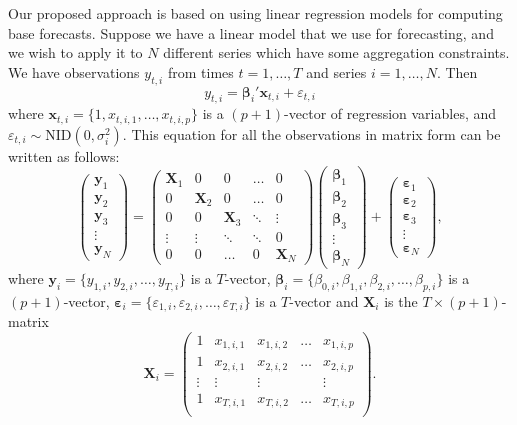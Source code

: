 \documentclass[11pt,a4paper,]{article}
\begin{document}
Our proposed approach is based on using linear regression models for computing base forecasts. Suppose we have a linear model that we use for forecasting, and we wish to apply it to \(N\) different series which have some aggregation constraints. We have observations \(y_{t,i}\) from times \(t=1,\dots,T\) and series \(i=1,\dots,N\). Then
\begin{equation}
y_{t,i} = \bm{\beta}_{i}' \bm{x}_{t,i} + \varepsilon_{t,i}
\end{equation}
where \(\bm{x}_{t,i}=\{1, x_{t,i,1},\dots,x_{t,i,p}\}\) is a \((p+1)\)-vector of regression variables, and \(\varepsilon_{t,i}\sim \text{NID}(0,\sigma_i^2)\). This equation for all the observations in matrix form can be written as follows:
\begin{equation}\label{eq:linearmodel}
\begin{pmatrix}
\bm{y}_1\\
\bm{y}_2\\
\bm{y}_3 \\
\vdots\\
\bm{y}_N
\end{pmatrix}=
\begin{pmatrix}
\bm{X}_1 & 0        & 0       & \dots  & 0\\
0        & \bm{X}_2 & 0        & \dots  & 0\\
0        & 0        & \bm{X}_3 & \ddots & \vdots \\
\vdots   & \vdots   & \ddots   & \ddots & 0\\
0        & 0    & \dots    & 0      & \bm{X}_N
\end{pmatrix}
\begin{pmatrix}
\bm{\beta}_1\\
\bm{\beta}_2\\
\bm{\beta}_3\\
\vdots\\
\bm{\beta}_N
\end{pmatrix}+
\begin{pmatrix}
\bm{\varepsilon}_1\\
\bm{\varepsilon}_2\\
\bm{\varepsilon}_3\\
\vdots \\
\bm{\varepsilon}_N
\end{pmatrix},
\end{equation}
where \(\bm{y}_i = \{y_{1,i}, y_{2,i}, \dots, y_{T,i}\}\) is a \(T\)-vector, \({\bm{\beta}}_i = \{\beta_{0,i}, \beta_{1,i}, \beta_{2,i}, \dots, \beta_{p,i}\}\) is a \((p+1)\)-vector, \({\bm{\varepsilon}}_i = \{\varepsilon_{1,i}, \varepsilon_{2,i}, \dots, \varepsilon_{T,i}\}\) is a \(T\)-vector and \(\bm{X}_i\) is the \(T\times (p+1)\)-matrix
\begin{equation}
\bm{X}_i = \begin{pmatrix}
1 & x_{1,i,1} & x_{1,i,2} & \dots & x_{1,i,p}\\
1 & x_{2,i,1} & x_{2,i,2} & \dots & x_{2,i,p}\\
\vdots & \vdots & \vdots & & \vdots \\
1 & x_{T,i,1} & x_{T,i,2} & \dots & x_{T,i,p}\\
\end{pmatrix}.
\end{equation}
\end{document}
